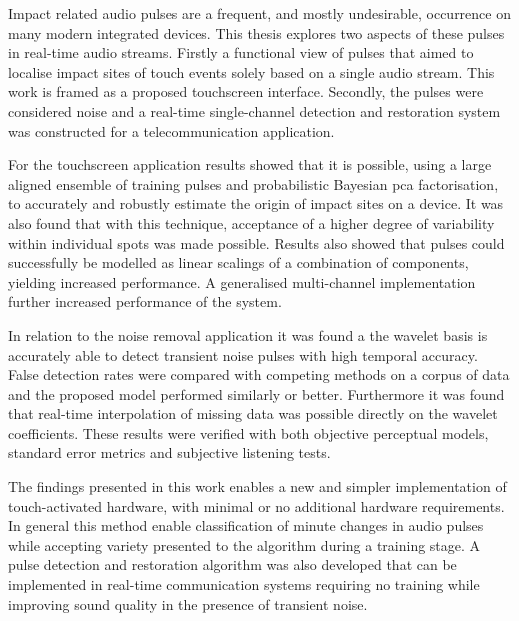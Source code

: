 

\begin{thesissummary}
Impact related audio pulses are a frequent, and mostly undesirable, occurrence on many modern integrated devices. This thesis explores two aspects of these pulses in real-time audio streams. Firstly a functional view of pulses that aimed to localise impact sites of touch events solely based on a single audio stream. This work is framed as a proposed touchscreen interface. Secondly, the pulses were considered noise and a real-time single-channel detection and restoration system was constructed for a telecommunication application.

For the touchscreen application results showed that it is possible, using a large aligned ensemble of training pulses and probabilistic Bayesian \gls{pca} factorisation, to accurately and robustly estimate the origin of impact sites on a device. It was also found that with this technique, acceptance of a higher degree of variability within individual spots was made possible. Results also showed that pulses could successfully be modelled as linear scalings of a combination of components, yielding increased performance. A generalised multi-channel implementation further increased performance of the system.

In relation to the noise removal application it was found a the wavelet basis is accurately able to detect transient noise pulses with high temporal accuracy. False detection rates were compared with competing methods on a corpus of data and the proposed model performed similarly or better. Furthermore it was found that real-time interpolation of missing data was possible directly on the wavelet coefficients. These results were verified with both objective perceptual models, standard error metrics and subjective listening tests.

The findings presented in this work enables a new and simpler implementation of touch-activated hardware, with minimal or no additional hardware requirements. In general this method enable classification of minute changes in audio pulses while accepting variety presented to the algorithm during a training stage. A pulse detection and restoration algorithm was also developed that can be implemented in real-time communication systems requiring no training while improving sound quality in the presence of transient noise.

\end{thesissummary}





